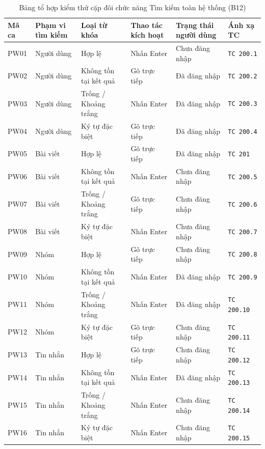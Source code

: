\documentclass[11pt,a4paper]{article}
\begin{document}
\begin{table}[H]
\centering
\small
\begin{tabularx}{\textwidth}{|C{1.2cm}|L{2.1cm}|X|L{2.5cm}|L{2.7cm}|C{2.0cm}|}
\hline
{}
\textbf{Mã ca} & \textbf{Phạm vi tìm kiếm} & \textbf{Loại từ khóa} & \textbf{Thao tác kích hoạt} & \textbf{Trạng thái người dùng} & \textbf{Ánh xạ TC} \tabularnewline
\hline
PW01 & Người dùng & Hợp lệ & Nhấn Enter & Chưa đăng nhập & \texttt{TC 200.1} \\ \hline
PW02 & Người dùng & Không tồn tại kết quả & Gõ trực tiếp & Đã đăng nhập & \texttt{TC 200.2} \\ \hline
PW03 & Người dùng & Trống / Khoảng trắng & Nhấn Enter & Đã đăng nhập & \texttt{TC 200.3} \\ \hline
PW04 & Người dùng & Ký tự đặc biệt & Gõ trực tiếp & Đã đăng nhập & \texttt{TC 200.4} \\ \hline
PW05 & Bài viết & Hợp lệ & Gõ trực tiếp & Đã đăng nhập & \texttt{TC 201} \\ \hline
PW06 & Bài viết & Không tồn tại kết quả & Nhấn Enter & Chưa đăng nhập & \texttt{TC 200.5} \\ \hline
PW07 & Bài viết & Trống / Khoảng trắng & Gõ trực tiếp & Chưa đăng nhập & \texttt{TC 200.6} \\ \hline
PW08 & Bài viết & Ký tự đặc biệt & Nhấn Enter & Chưa đăng nhập & \texttt{TC 200.7} \\ \hline
PW09 & Nhóm & Hợp lệ & Gõ trực tiếp & Chưa đăng nhập & \texttt{TC 200.8} \\ \hline
PW10 & Nhóm & Không tồn tại kết quả & Nhấn Enter & Đã đăng nhập & \texttt{TC 200.9} \\ \hline
PW11 & Nhóm & Trống / Khoảng trắng & Nhấn Enter & Đã đăng nhập & \texttt{TC 200.10} \\ \hline
PW12 & Nhóm & Ký tự đặc biệt & Gõ trực tiếp & Chưa đăng nhập & \texttt{TC 200.11} \\ \hline
PW13 & Tin nhắn & Hợp lệ & Gõ trực tiếp & Chưa đăng nhập & \texttt{TC 200.12} \\ \hline
PW14 & Tin nhắn & Không tồn tại kết quả & Nhấn Enter & Đã đăng nhập & \texttt{TC 200.13} \\ \hline
PW15 & Tin nhắn & Trống / Khoảng trắng & Nhấn Enter & Chưa đăng nhập & \texttt{TC 200.14} \\ \hline
PW16 & Tin nhắn & Ký tự đặc biệt & Nhấn Enter & Chưa đăng nhập & \texttt{TC 200.15} \\ \hline
\end{tabularx}
\caption{Bảng tổ hợp kiểm thử cặp đôi chức năng Tìm kiếm toàn hệ thống (B12)}
\end{table}
\end{document}
